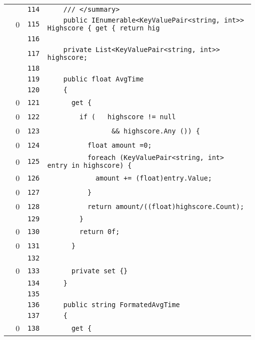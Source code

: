 \documentclass[a4paper,10pt]{article}
\begin{document}
\begin{longtable}[l]{lrrl}
\cellcolor{gray} &  & \verb~114~ & \verb~    /// </summary>~\\
\cellcolor{red} & 0 & \verb~115~ & \verb~    public IEnumerable<KeyValuePair<string, int>> Highscore { get { return hig~\\
\cellcolor{gray} &  & \verb~116~ & \verb~~\\
\cellcolor{gray} &  & \verb~117~ & \verb~    private List<KeyValuePair<string, int>> highscore;~\\
\cellcolor{gray} &  & \verb~118~ & \verb~~\\
\cellcolor{gray} &  & \verb~119~ & \verb~    public float AvgTime~\\
\cellcolor{gray} &  & \verb~120~ & \verb~    {~\\
\cellcolor{red} & 0 & \verb~121~ & \verb~      get {~\\
\cellcolor{red} & 0 & \verb~122~ & \verb~        if (   highscore != null~\\
\cellcolor{red} & 0 & \verb~123~ & \verb~                && highscore.Any ()) {~\\
\cellcolor{red} & 0 & \verb~124~ & \verb~          float amount =0;~\\
\cellcolor{red} & 0 & \verb~125~ & \verb~          foreach (KeyValuePair<string, int> entry in highscore) {~\\
\cellcolor{red} & 0 & \verb~126~ & \verb~            amount += (float)entry.Value;~\\
\cellcolor{red} & 0 & \verb~127~ & \verb~          }~\\
\cellcolor{red} & 0 & \verb~128~ & \verb~          return amount/((float)highscore.Count);~\\
\cellcolor{gray} &  & \verb~129~ & \verb~        }~\\
\cellcolor{red} & 0 & \verb~130~ & \verb~        return 0f;~\\
\cellcolor{red} & 0 & \verb~131~ & \verb~      }~\\
\cellcolor{gray} &  & \verb~132~ & \verb~~\\
\cellcolor{red} & 0 & \verb~133~ & \verb~      private set {}~\\
\cellcolor{gray} &  & \verb~134~ & \verb~    }~\\
\cellcolor{gray} &  & \verb~135~ & \verb~~\\
\cellcolor{gray} &  & \verb~136~ & \verb~    public string FormatedAvgTime~\\
\cellcolor{gray} &  & \verb~137~ & \verb~    {~\\
\cellcolor{red} & 0 & \verb~138~ & \verb~      get {~\\

\end{longtable}
\end{document}
